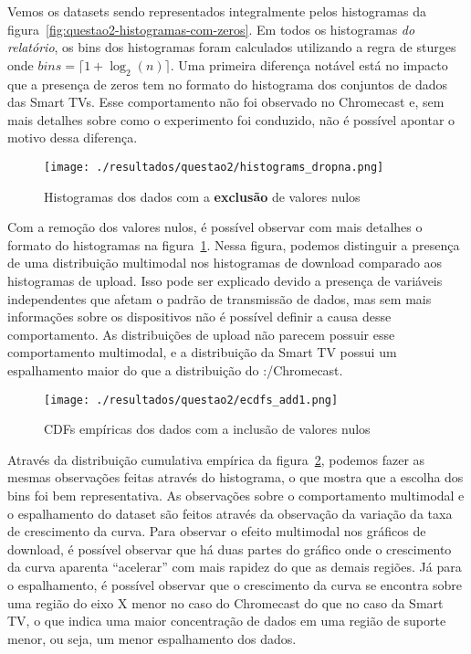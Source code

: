 \documentclass{article}
\begin{document}
Vemos os datasets sendo representados integralmente pelos histogramas da figura~\ref{fig:questao2-histogramas-com-zeros}. Em todos os histogramas \textit{do relatório}, os bins dos histogramas foram calculados utilizando a regra de sturges onde $bins=\lceil1+\log_2(n)\rceil$. Uma primeira diferença notável está no impacto que a presença de zeros tem no formato do histograma dos conjuntos de dados das Smart TVs. Esse comportamento não foi observado no Chromecast e, sem mais detalhes sobre como o experimento foi conduzido, não é possível apontar o motivo dessa diferença.

\begin{figure}[h]
	\centering
	\caption{Histogramas dos dados com a \textbf{exclusão} de valores nulos}
	\texttt{[image: ./resultados/questao2/histograms\_dropna.png]}
	\label{fig:questao2-histogramas-sem-zeros}
\end{figure}

Com a remoção dos valores nulos, é possível observar com mais detalhes o formato do histogramas na figura~\ref{fig:questao2-histogramas-sem-zeros}. Nessa figura, podemos distinguir a presença de uma distribuição multimodal nos histogramas de download comparado aos histogramas de upload. Isso pode ser explicado devido a presença de variáveis independentes que afetam o padrão de transmissão de dados, mas sem mais informações sobre os dispositivos não é possível definir a causa desse comportamento. As distribuições de upload não parecem possuir esse comportamento multimodal, e a distribuição da Smart TV possui um espalhamento maior do que a distribuição do :/Chromecast.



\begin{figure}[h]
	\centering
	\caption{CDFs empíricas dos dados com a inclusão de valores nulos}
	\texttt{[image: ./resultados/questao2/ecdfs\_add1.png]}
	\label{fig:questao2-ecdf}
\end{figure}

Através da distribuição cumulativa empírica da figura~\ref{fig:questao2-ecdf}, podemos fazer as mesmas observações feitas através do histograma, o que mostra que a escolha dos bins foi bem representativa. As observações sobre o comportamento multimodal e o espalhamento do dataset são feitos através da observação da variação da taxa de crescimento da curva. Para observar o efeito multimodal nos gráficos de download, é possível observar que há duas partes do gráfico onde o crescimento da curva aparenta ``acelerar'' com mais rapidez do que as demais regiões. Já para o espalhamento, é possível observar que o crescimento da curva se encontra sobre uma região do eixo X menor no caso do Chromecast do que no caso da Smart TV, o que indica uma maior concentração de dados em uma região de suporte menor, ou seja, um menor espalhamento dos dados.
\end{document}
